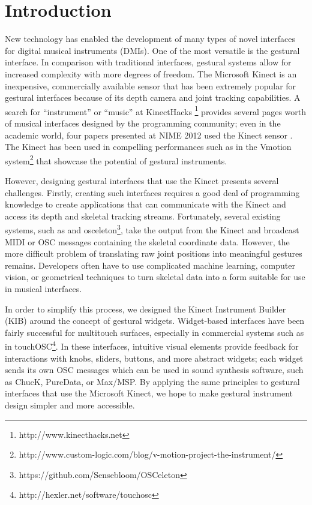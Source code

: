 \documentclass{nime-alternate}
\begin{document}
\section{Introduction}
New technology has enabled the development of many types of novel interfaces for digital
musical instruments (DMIs). One of the most versatile is the gestural interface. In comparison
with traditional interfaces, gestural systems allow for increased complexity with more degrees
of freedom. The Microsoft Kinect is an inexpensive, commercially available sensor that has been
extremely popular for gestural interfaces because of its depth camera and joint tracking
capabilities. A search for ``instrument'' or ``music'' at KinectHacks
\footnote{http://www.kinecthacks.net} provides
several pages worth of musical interfaces designed by the programming community; even in the
academic world, four papers presented at NIME 2012 used the Kinect sensor \cite{nimekinect1, nimekinect2, nimekinect3, digito}. The Kinect has been used in compelling performances
such as in the Vmotion system\footnote{http://www.custom-logic.com/blog/v-motion-project-the-instrument/} that showcase the potential of gestural instruments.

However, designing gestural interfaces that use the Kinect presents several challenges. 
Firstly, creating such interfaces requires a good deal of programming knowledge to create
applications that can communicate with the Kinect and access its depth and skeletal tracking streams. 
Fortunately, several existing systems, such as \cite{yoo2011creating} and osceleton\footnote{https://github.com/Sensebloom/OSCeleton}, take the output from
the Kinect and broadcast MIDI or OSC messages containing the skeletal coordinate data. However,
the more difficult problem of translating raw joint positions into meaningful gestures remains.
Developers often have to use complicated machine learning, computer vision, or geometrical
techniques to turn skeletal data into a form suitable for use in musical interfaces. 

In order to simplify this process, we designed the Kinect Instrument Builder (KIB) around the
concept of gestural widgets. Widget-based interfaces have been fairly successful for multitouch
surfaces, especially in commercial systems such as in touchOSC\footnote{http://hexler.net/software/touchosc}. In these interfaces, intuitive visual elements provide feedback for interactions
with knobs, sliders, buttons, and more abstract widgets; each widget sends its own OSC messages
which can be used in sound synthesis software, such as ChucK, PureData, or Max/MSP. By applying
the same principles to gestural interfaces that use the Microsoft Kinect, we hope to make gestural
instrument design simpler and more accessible. 
\end{document}
